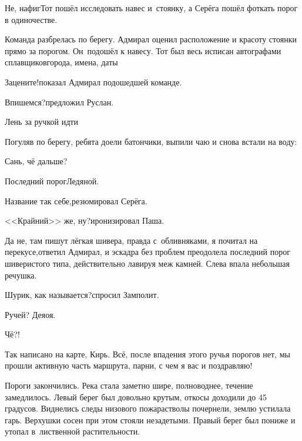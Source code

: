 \diagdash Не, нафиг\myldots{}\mdash Тот пошёл исследовать навес и~стоянку, а Серёга пошёл фоткать порог в одиночестве. 

Команда разбрелась по берегу. Адмирал оценил расположение и красоту стоянки прямо за порогом. Он~подошёл к навесу. Тот был весь исписан автографами сплавщиков\mdash города, имена, даты\myldots{}

\diagdash Зацените!\mdash показал Адмирал подошедшей команде.

\diagdash Впишемся?\mdash предложил Руслан.

\diagdash Лень за ручкой идти\myldots{}

\vspace{0.1cm}
\myldots{}Погуляв по берегу, ребята доели батончики, выпили чаю и снова встали на воду:

\diagdash Сань, чё дальше?

\diagdash Последний порог\mdash Ледяной.

\diagdash Название так себе,\mdash резюмировал Серёга.

\diagdash <<Крайний>> же, ну?\mdash иронизировал Паша.

\diagdash Да не, там пишут лёгкая шивера, правда с~обливняками, я почитал на перекусе,\mdash ответил Адмирал, и эскадра без проблем преодолела последний порог шиверистого типа, действительно лавируя меж камней. Слева впала небольшая речушка.

\diagdash Шурик, как называется?\mdash спросил Замполит.

\diagdash Ручей? Деяоя.

\diagdash Чё?!

\diagdash Так написано на карте, Кирь. Всё, после впадения этого ручья порогов нет, мы прошли активную часть маршрута, парни, с чем я вас и поз\sdash дра\sdash вля\sdash ю!


Пороги закончились. Река стала заметно шире, полноводнее, течение замедлилось. Левый берег был довольно крутым, откосы доходили до 45 градусов. Виднелись следы низового пожара\mdash стволы почернели, землю устилала гарь. Верхушки сосен при этом стояли незадетыми. Правый берег был пониже и утопал в~лиственной растительности. 

